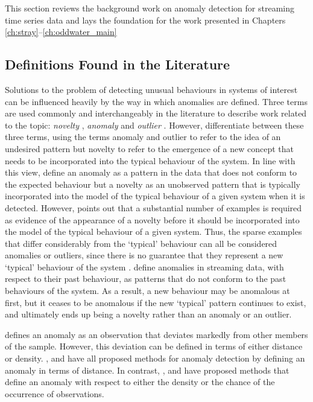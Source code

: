 \documentclass{monashthesis}
\theoremstyle{definition}
\theoremstyle{definition}
\theoremstyle{definition}
\theoremstyle{remark}
\begin{document}
This section reviews the background work on anomaly detection for
streaming time series data and lays the foundation for the work presented in Chapters \ref{ch:stray}--\ref{ch:oddwater_main}

\hypertarget{definitions-found-in-the-literature}{%
\subsection{Definitions Found in the Literature}\label{definitions-found-in-the-literature}}

Solutions to the problem of detecting unusual behaviours in systems of interest can be influenced heavily by the way in which anomalies are defined. Three terms are used commonly and interchangeably in the literature to describe work related to the topic: \emph{novelty} \autocite{clifton2011novelty,hugueny2013novelty}, \emph{anomaly} \autocite{hyndman2015large,kumar2016adaptive} and \emph{outlier} \autocite{schwarz2008wind,wilkinsonvisualizing}. However, \textcite{faria2016novelty} differentiate between these three terms, using the terms anomaly and outlier to refer to the idea of an undesired pattern but novelty to refer to the emergence of a new concept that needs to be incorporated into the typical behaviour of the system. In line with this view, \textcite{chandola2009anomaly} define an anomaly as a pattern in the data that does not conform to the expected behaviour but a novelty as an unobserved pattern that is typically incorporated into the model of the typical behaviour of a given system when it is detected. However, \textcite{gama2010knowledge} points out that a substantial number of examples is required as evidence of the appearance of a novelty before it should be incorporated into the model of the typical behaviour of a given system. Thus, the sparse examples that differ considerably from the `typical' behaviour can all be considered anomalies or outliers, since there is no guarantee that they represent a new
`typical' behaviour of the system \autocite{faria2016novelty}. \textcite{lavin2015evaluating} define anomalies in streaming data, with respect to their past behaviour, as
patterns that do not conform to the past behaviours of the system. As a result, a new behaviour may be anomalous at first, but it ceases to be
anomalous if the new `typical' pattern continues to exist, and ultimately
ends up being a novelty rather than an anomaly or an outlier.

\textcite{grubbs1969procedures} defines an anomaly as an observation that deviates markedly from other members of the sample. However, this deviation can be defined in terms of either distance or density. \textcite{burridge2006additive}, \textcite{wilkinsonvisualizing} and \textcite{schwarz2008wind} have all proposed methods for
anomaly detection by defining an anomaly in terms of distance. In contrast, \textcite{hyndman1996computing}, \textcite{clifton2011novelty} and \textcite{hugueny2013novelty} have proposed methods that define an anomaly with respect to either the density or the chance of the occurrence of observations.
\end{document}
